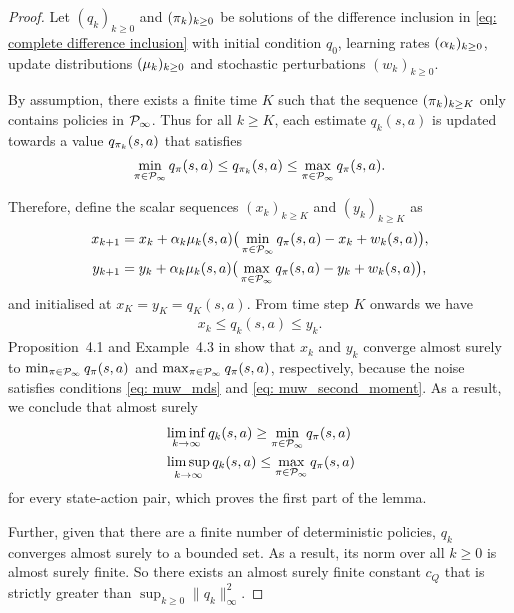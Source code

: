 \begin{proof}
    Let $(q_k)_{k \ge 0}$ and $(\pi_k)_{k \ge 0}$ be solutions of the difference inclusion in \eqref{eq: complete difference inclusion} with initial condition $q_0$, learning rates $(\alpha_k)_{k \ge 0}$, update distributions $(\mu_k)_{k \ge 0}$ and stochastic perturbations $(w_k)_{k \ge 0}$.
    
    By assumption, there exists a finite time $K$ such that
    the sequence $(\pi_k)_{k \ge K}$ only contains policies in $\mathcal{P}_\infty$.
    Thus for all $k \ge K$, each estimate $q_k(s,a)$ is updated towards a value $q_{\pi_k}(s,a)$ that satisfies
    \begin{align}
        \min_{\pi \in \mathcal{P}_\infty} q_\pi(s,a) \leq q_{\pi_k}(s,a) \leq \max_{\pi \in \mathcal{P}_\infty} q_\pi(s,a) .
    \end{align}
    
    Therefore, define the scalar sequences $(x_k)_{k \ge K}$ and $(y_k)_{k \ge K}$ as
    \begin{align}
        x_{{k+1}} &= x_k + \alpha_k \mu_k(s,a) 
        \big( \min_{\pi \in \mathcal{P}_\infty} q_\pi(s,a) - x_k + w_k(s,a) \big) ,
        \\
        y_{{k+1}} &= y_k + \alpha_k \mu_k(s,a) \big( \max_{\pi \in \mathcal{P}_\infty} q_\pi(s,a) - y_k + w_k(s,a) \big) ,
    \end{align}
    and initialised at $x_K = y_K = q_K(s,a)$. From time step $K$ onwards we have
    \begin{align*}
        x_k \leq q_k(s,a) \leq y_k .
    \end{align*}
    Proposition~4.1 and Example~4.3 in \citep{Bertsekas1996Neuro-DynamicProgramming} show that $x_k$ and $y_k$ converge almost surely to $\min_{\pi \in \mathcal{P}_\infty} q_\pi(s,a)$ and $\max_{\pi \in \mathcal{P}_\infty} q_\pi(s,a)$, respectively, because the noise satisfies conditions \eqref{eq: muw_mds} and \eqref{eq: muw_second_moment}.
    As a result, we conclude that almost surely
    \begin{align*}
        &\liminf_{k \to \infty} q_k(s,a)
        \ge \min_{\pi \in \mathcal{P}_\infty} q_\pi(s,a)
        \\
        &\limsup_{k \to \infty} q_k(s,a)
        \le \max_{\pi \in \mathcal{P}_\infty} q_\pi(s,a)
    \end{align*}
    for every state-action pair,
    which proves the first part of the lemma.

    Further,
    given that there are a finite number of deterministic policies, $q_k$ converges almost surely to a bounded set.
    As a result, 
    its norm over all $k \geq 0$ is almost surely finite. So there exists an almost surely finite constant $c_Q$ that is strictly greater than $\sup_{k \geq 0} \|q_k\|_\infty^2$.
\end{proof}